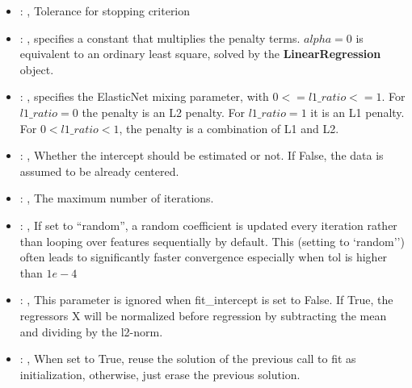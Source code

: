 \begin{itemize}
    \item {}: , 
      Tolerance for stopping criterion

    \item {}: , 
      specifies a constant                                                  that multiplies the
      penalty terms.                                                  $alpha = 0$ is equivalent to
      an ordinary least square, solved by the
      \textbf{LinearRegression} object.

    \item {}: , 
      specifies the                                                  ElasticNet mixing parameter,
      with $0 <= l1\_ratio <= 1$.                                                  For $l1\_ratio =
      0$ the penalty is an L2 penalty.                                                  For
      $l1\_ratio = 1$ it is an L1 penalty.                                                  For $0 <
      l1\_ratio < 1$, the penalty is a combination of L1 and L2.

    \item {}: , 
      Whether the intercept should be estimated or not. If False,
      the data is assumed to be already centered.

    \item {}: , 
      The maximum number of iterations.

    \item {}: , 
      If set to ``random'', a random coefficient is updated every iteration
      rather than looping over features sequentially by default. This (setting to `random'')
      often leads to significantly faster convergence especially when tol is higher than $1e-4$

    \item {}: , 
      This parameter is ignored when fit\_intercept is set to False. If True,
      the regressors X will be normalized before regression by subtracting the mean and
      dividing by the l2-norm.

    \item {}: , 
      When set to True, reuse the solution of the previous call
      to fit as initialization, otherwise, just erase the previous solution.
  \end{itemize}


